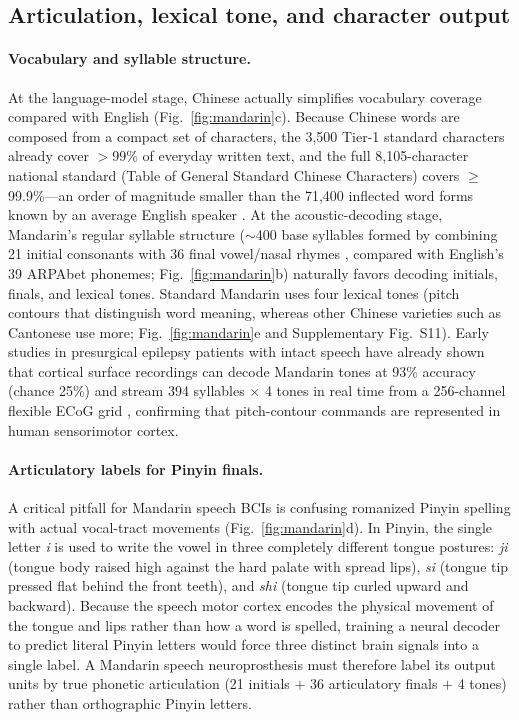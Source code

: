 \documentclass[11pt]{article}
\begin{document}
\subsection{Articulation, lexical tone, and character output}

\paragraph{Vocabulary and syllable structure.} At the language-model
stage, Chinese actually simplifies vocabulary coverage compared with
English (Fig.~\ref{fig:mandarin}c). Because Chinese words are composed
from a compact set of characters, the 3{,}500 Tier-1 standard characters
already cover $>$99\% of everyday written text, and the full
8{,}105-character national standard (Table of General Standard Chinese
Characters) covers $\geq$99.9\%---an order of magnitude smaller than the
71{,}400 inflected word forms known by an average English speaker
\cite{brysbaert2016}. At the acoustic-decoding stage, Mandarin's regular
syllable structure ($\sim$400 base syllables formed by combining 21
initial consonants with 36 final vowel/nasal rhymes
\cite{huangliao2017}, compared with English's 39 ARPAbet phonemes;
Fig.~\ref{fig:mandarin}b) naturally favors decoding initials, finals,
and lexical tones. Standard Mandarin uses four lexical tones (pitch
contours that distinguish word meaning, whereas other Chinese varieties
such as Cantonese use more; Fig.~\ref{fig:mandarin}e and Supplementary
Fig.~S11). Early studies in presurgical epilepsy patients with intact
speech have already shown that cortical surface recordings can decode
Mandarin tones at 93\% accuracy (chance 25\%) \cite{zhangd2024} and
stream 394 syllables $\times$ 4 tones in real time from a 256-channel
flexible ECoG grid \cite{qian2025}, confirming that pitch-contour
commands are represented in human sensorimotor cortex.

\paragraph{Articulatory labels for Pinyin finals.} A critical
pitfall for Mandarin speech BCIs is confusing romanized Pinyin spelling
with actual vocal-tract movements (Fig.~\ref{fig:mandarin}d). In Pinyin,
the single letter \emph{i} is used to write the vowel in three
completely different tongue postures: \emph{ji} (tongue body raised high
against the hard palate with spread lips), \emph{si} (tongue tip pressed
flat behind the front teeth), and \emph{shi} (tongue tip curled upward
and backward). Because the speech motor cortex encodes the physical
movement of the tongue and lips rather than how a word is spelled,
training a neural decoder to predict literal Pinyin letters would force
three distinct brain signals into a single label. A Mandarin speech
neuroprosthesis must therefore label its output units by true phonetic
articulation (21 initials $+$ 36 articulatory finals $+$ 4 tones) rather
than orthographic Pinyin letters.
\end{document}
